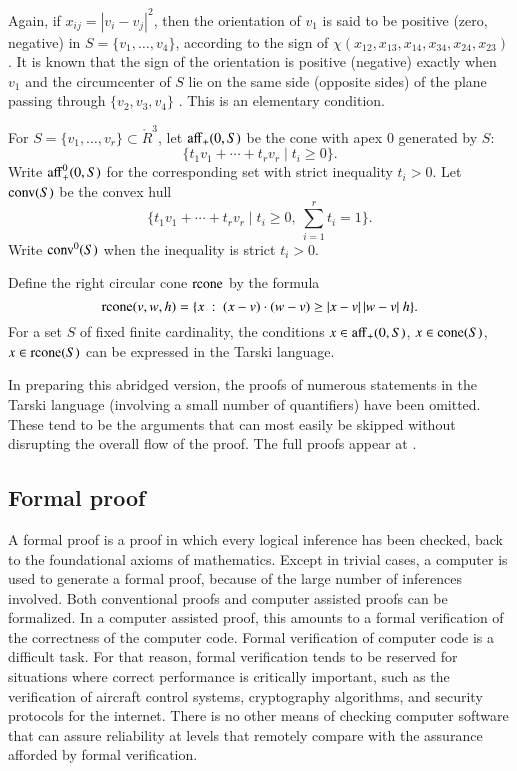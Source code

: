 \documentclass{article} %
\begin{document}
Again, if $x_{ij}=|v_i-v_j|^2$, then the orientation
of $v_1$ is said to be positive (zero, negative) in $S=\{v_1,\ldots,v_4\}$,
according to the sign of $\chi(x_{12},x_{13},x_{14},x_{34},x_{24},x_{23})$.
It is known that the sign of the orientation is positive (negative) exactly
when $v_1$ and the circumcenter of $S$ lie on the same side (opposite sides) of the
plane passing through $\{v_2,v_3,v_4\}$
\cite[Lemma~5.15]{Hales:2006:DCG}. This is an elementary condition.

For $S=\{v_1,\ldots,v_r\}\subset\ring{R}^3$, let ${\operatorname{aff}}_+(0,S)$
be the cone with apex $0$ generated by $S$:
$$
\{ t_1 v_1 + \cdots + t_r v_r \mid  t_i \ge 0\}.
$$
Write ${\operatorname{aff}}_+^0(0,S)$ for the corresponding set with
strict inequality $t_i >0$.
Let ${\operatorname{conv}}(S)$ be the convex hull
$$
\{ t_1 v_1 + \cdots + t_r v_r \mid t_i \ge 0,\ \sum_{i=1}^r t_i=1\}.
$$
Write ${\operatorname{conv}}^0(S)$ when the inequality is strict $t_i >0$.

Define the right circular cone ${\operatorname{rcone}}$ by the formula
$${\operatorname{rcone}}(v,w,h) = \{x\ :\  (x-v)\cdot (w-v) \ge |x-v|\,|w-v|\ h\}.$$
For a set $S$ of fixed finite cardinality, the conditions $x\in{\operatorname{aff}}_+(0,S)$,
$x\in{\operatorname{cone}}(S)$, $x\in{\operatorname{rcone}}(S)$ can be expressed
in the Tarski language.

In preparing this abridged version, the proofs of numerous statements
in the Tarski language (involving a small number of quantifiers) have
been omitted.  These tend to be the arguments that can most easily
be skipped without disrupting the overall flow of the proof.
The full proofs appear at \cite{Hales:2002:Dodec}.

\subsection{Formal proof}

A formal proof is a proof in which every logical inference has been
checked, back to the foundational axioms of mathematics. Except in
trivial cases, a computer is used to generate a formal proof, because
of the large number of inferences involved. Both conventional proofs
and computer assisted proofs can be formalized. In a computer assisted
proof, this amounts to a formal verification of the correctness of the
computer code. Formal verification of computer code is a difficult
task. For that reason, formal verification tends to be reserved for
situations where correct performance is critically important, such as
the verification of aircraft control systems, cryptography algorithms,
and security protocols for the internet. There is no other means of
checking computer software that can assure reliability at levels that
remotely compare with the assurance afforded by formal verification.
\end{document}
